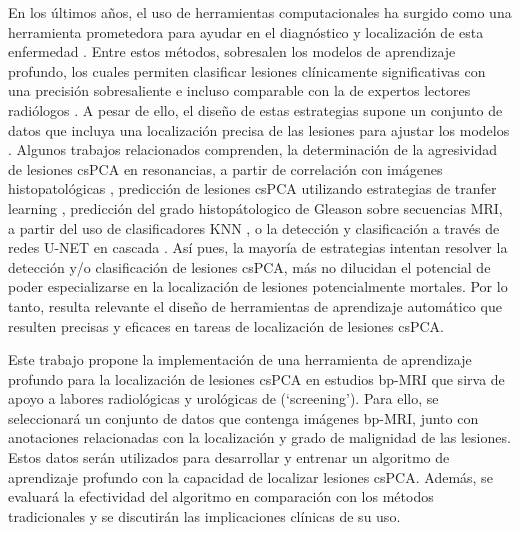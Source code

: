 En los últimos años, el uso de herramientas computacionales ha surgido como una herramienta prometedora para ayudar en el diagnóstico y localización de esta enfermedad . Entre estos métodos, sobresalen los modelos de aprendizaje profundo, los cuales permiten clasificar lesiones clínicamente significativas con una precisión sobresaliente e incluso comparable con la de expertos lectores radiólogos . A pesar de ello, el diseño de estas estrategias supone un conjunto de datos que incluya una localización precisa de las lesiones para ajustar los modelos . Algunos trabajos relacionados comprenden, la determinación de la agresividad de lesiones csPCA en resonancias, a partir de correlación con imágenes histopatológicas , predicción de lesiones csPCA utilizando estrategias de tranfer learning , predicción del grado histopátologico de Gleason sobre secuencias MRI, a partir del uso de clasificadores KNN , o la detección y clasificación a través de redes U-NET en cascada . Así pues, la mayoría de estrategias intentan resolver la detección y/o clasificación de lesiones csPCA, más no dilucidan el potencial de poder especializarse en la localización de lesiones potencialmente mortales. Por lo tanto, resulta relevante el diseño de herramientas de aprendizaje automático que resulten precisas y eficaces en tareas de localización de lesiones csPCA.

Este trabajo propone la implementación de una herramienta de aprendizaje profundo para la localización de lesiones csPCA en estudios bp-MRI que sirva de apoyo a labores radiológicas y urológicas de (`screening'). Para ello, se seleccionará un conjunto de datos que contenga imágenes bp-MRI, junto con anotaciones relacionadas con la localización y grado de malignidad de las lesiones. Estos datos serán utilizados para desarrollar y entrenar un algoritmo de aprendizaje profundo con la capacidad de localizar lesiones csPCA. Además, se evaluará la efectividad del algoritmo en comparación con los métodos tradicionales y se discutirán las implicaciones clínicas de su uso. 